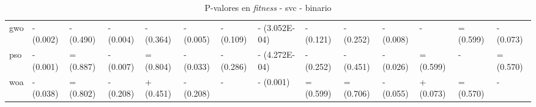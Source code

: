 \begin{table}
\begin{adjustbox}{width=\linewidth}
\begin{tabular}{llllllllllllll}
            gwo   & - (0.002) & - (0.490) & - (0.004) & - (0.364) & - (0.005) & - (0.109) & - (3.052E-04) & - (0.121) & - (0.252) & - (0.008) & -             & = (0.599)     & - (0.073) \\
            pso   & - (0.001) & = (0.887) & - (0.007) & = (0.804) & - (0.033) & - (0.286) & - (4.272E-04) & - (0.252) & - (0.451) & - (0.026) & = (0.599)     & -             & = (0.570) \\
            woa   & - (0.038) & = (0.802) & - (0.208) & + (0.451) & - (0.208) & -         & - (0.001)     & = (0.599) & = (0.706) & - (0.055) & + (0.073)     & = (0.570)     & -         \\
            \bottomrule
        \end{tabular}
    \end{adjustbox}
    \caption{P-valores en \textit{fitness} - svc - binario}
\end{table}

